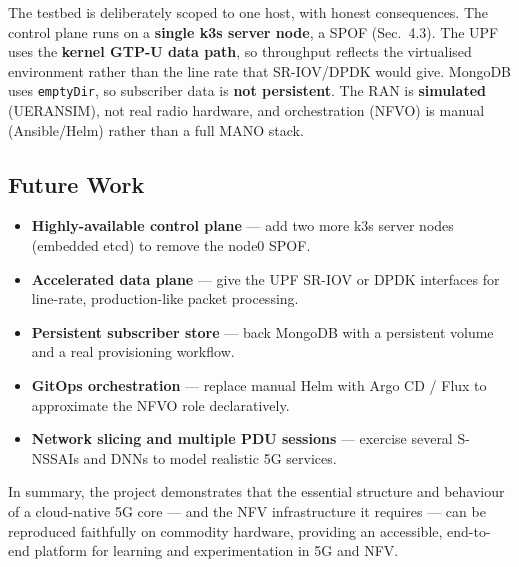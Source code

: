 The testbed is deliberately scoped to one host, with honest consequences.
The control plane runs on a \textbf{single k3s server node}, a SPOF (Sec.~4.3).
The UPF uses the \textbf{kernel GTP-U data path}, so throughput reflects the
virtualised environment rather than the line rate that SR-IOV/DPDK would give.
MongoDB uses \texttt{emptyDir}, so subscriber data is \textbf{not persistent}.
The RAN is \textbf{simulated} (UERANSIM), not real radio hardware, and
orchestration (NFVO) is manual (Ansible/Helm) rather than a full MANO stack.

\subsection{Future Work}

\begin{itemize}
    \item \textbf{Highly-available control plane} --- add two more k3s server
          nodes (embedded etcd) to remove the node0 SPOF.
    \item \textbf{Accelerated data plane} --- give the UPF SR-IOV or DPDK
          interfaces for line-rate, production-like packet processing.
    \item \textbf{Persistent subscriber store} --- back MongoDB with a
          persistent volume and a real provisioning workflow.
    \item \textbf{GitOps orchestration} --- replace manual Helm with Argo CD /
          Flux to approximate the NFVO role declaratively.
    \item \textbf{Network slicing and multiple PDU sessions} --- exercise
          several S-NSSAIs and DNNs to model realistic 5G services.
\end{itemize}

In summary, the project demonstrates that the essential structure and
behaviour of a cloud-native 5G core --- and the NFV infrastructure it
requires --- can be reproduced faithfully on commodity hardware, providing an
accessible, end-to-end platform for learning and experimentation in 5G and NFV.
